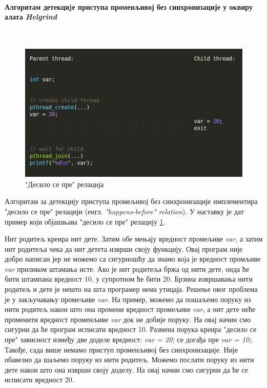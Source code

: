 \documentclass[12pt,oneside]{memoir}
\begin{document}
\paragraph{Алгоритам детекциjе приступа променљивој без синхронизације у оквиру алата \textit{Helgrind}} \mbox{}\\

\begin{figure}[h!]
\begin{center}
\includegraphics[scale=0.75]{slika16.png}
\end{center}
\caption{"Десило се пре" релација}
\label{fig:dspPrincip}
\end{figure}


\indent Алгоритам за детекцију приступа промељивој без синхронизације имплементира "десило се пре" релацији (енгл. \textit{"happens-before" relation}). У наставку је дат пример који објашњава "десило се пре" релацију \ref{fig:dspPrincip}.

\indent Нит родитељ креира нит дете. Затим обе мењају вредност промељиве \textit{var}, а затим нит родитеља чека да нит детета изврши своју функцију. Овај програм није добро написан јер не можемо са сигурношћу да знамо која је вредност промљиве \textit{var} приликом штамања исте. Ако је нит родитеља бржа од нити дете, онда ће бити штампана вредност 10, у супротном ће бити 20. Брзина извршавања нити родитељ и дете је нешто на шта програмер нема утицаја. Решење овог проблема је у закључавању промељиве \textit{var}. На пример, можемо да пошаљемо поруку из нити родитељ након што она промени вредност промељиве \textit{var}, а нит дете неће променити вредност променљиве \textit{var} док не добије поруку. На овај начин смо сигурни  да ће програм исписати вредност 10. Размена порука креира "десило се пре" зависност између две доделе вредност: \textit{var = 20;} се догађа пре \textit{var = 10;}. Такође, сада више немамо приступ променљивој без синхронизације. Није обавезно да шаљемо поруку из нити родитељ. Можемо послати поруку из нити дете након што она изврши своју доделу. На овај начин смо сигурни да ће се исписати вредност 20.
\end{document}
